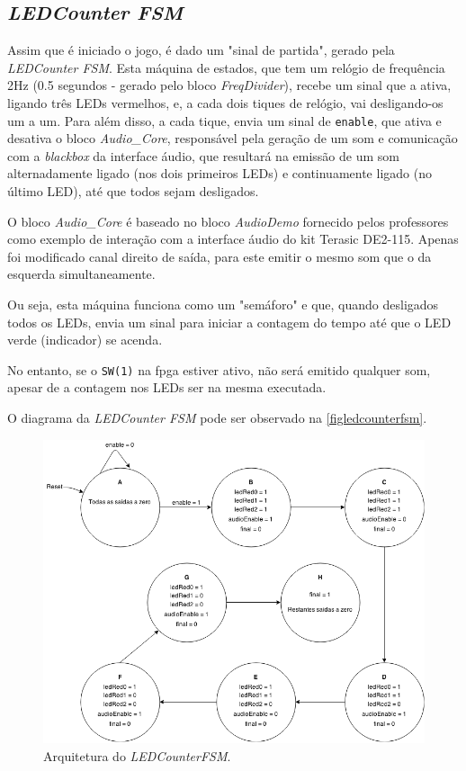 \documentclass[a4paper,11pt,onecolumn]{report}
\begin{document}
\subsection{\textit{LEDCounter FSM}}

Assim que é iniciado o jogo, é dado um "sinal de partida", gerado pela \textit{LEDCounter FSM}. Esta máquina de estados, que tem um relógio de frequência 2Hz (0.5 segundos - gerado pelo bloco \textit{FreqDivider}), recebe um sinal que a ativa, ligando três LEDs vermelhos, e, a cada dois tiques de relógio, vai desligando-os um a um. Para além disso, a cada tique, envia um sinal de \texttt{enable}, que ativa e desativa o bloco \textit{Audio\_Core}, responsável pela geração de um som e comunicação com a \textit{blackbox} da interface áudio, que resultará na emissão de um som alternadamente ligado (nos dois primeiros LEDs) e continuamente ligado (no último LED), até que todos sejam desligados.

O bloco \textit{Audio\_Core} é baseado no bloco \textit{AudioDemo} fornecido pelos professores como exemplo de interação com a interface áudio do kit Terasic DE2-115. Apenas foi modificado canal direito de saída, para este emitir o mesmo som que o da esquerda simultaneamente.

Ou seja, esta máquina funciona como um "semáforo" e que, quando desligados todos os LEDs, envia um sinal para iniciar a contagem do tempo até que o LED verde (indicador) se acenda.

No entanto, se o \texttt{SW(1)} na \ac{fpga} estiver ativo, não será emitido qualquer som, apesar de a contagem nos LEDs ser na mesma executada.

O diagrama da \textit{LEDCounter FSM} pode ser observado na \autoref{figledcounterfsm}.

\pagebreak

\begin{figure}[h]
\centerline{\includegraphics[scale=0.30]{Images/LEDCounterFSMDiagram}}
\caption{Arquitetura do \textit{LEDCounterFSM}.}
\label{figledcounterfsm}
\end{figure}
\end{document}
